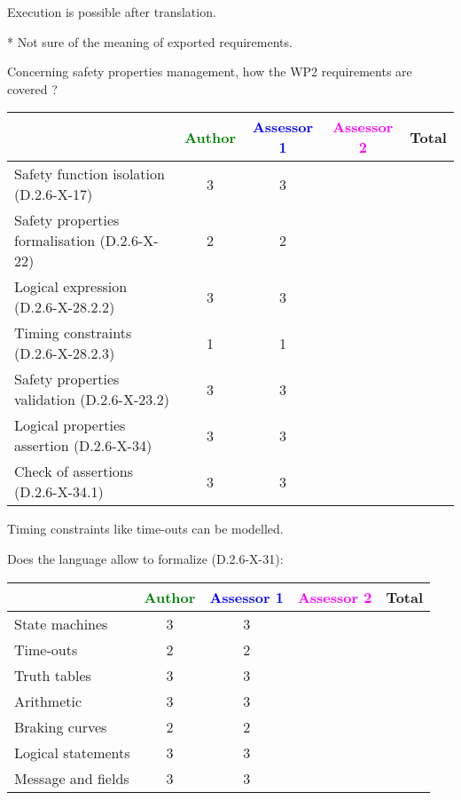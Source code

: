 \begin{author_comment}
Execution is possible after translation.
\end{author_comment}
\begin{assessor1}
* Not sure of the meaning of exported requirements.
\end{assessor1}

Concerning safety properties management, how the WP2 requirements are covered ?

\begin{tabular}{|l | c | c | c | c|}
\hline
& \textcolor{green}{Author} & \textcolor{blue}{Assessor 1} & \textcolor{magenta}{Assessor 2} & Total \\
\hline 
Safety function isolation (D.2.6-X-17)  & 3 & 3 & &  \\
\hline 
Safety properties formalisation (D.2.6-X-22)  & 2 & 2 & &  \\
\hline
Logical expression (D.2.6-X-28.2.2)  & 3 & 3 & &  \\
\hline
Timing constraints (D.2.6-X-28.2.3)  & 1 & 1 & &  \\
\hline
Safety properties validation (D.2.6-X-23.2)  & 3 & 3 & &  \\
\hline
Logical properties assertion (D.2.6-X-34)  &  3 & 3 & &  \\
\hline
Check  of assertions (D.2.6-X-34.1)  & 3 & 3 & &  \\
\hline
\end{tabular}


\begin{author_comment}
Timing constraints like time-outs can be modelled.
\end{author_comment}


Does the language allow to  formalize (D.2.6-X-31):

\begin{tabular}{|l | c | c | c | c|}
\hline
& \textcolor{green}{Author} & \textcolor{blue}{Assessor 1} & \textcolor{magenta}{Assessor 2} & Total \\
\hline 
State machines  & 3 & 3 & &  \\
\hline
Time-outs  & 2 & 2 & &  \\
\hline
Truth tables  & 3 & 3 & &  \\
\hline
Arithmetic  & 3 & 3 & &  \\
\hline
Braking curves  & 2 & 2 & &  \\
\hline
Logical statements & 3 & 3 & &  \\
\hline
Message and fields & 3 & 3 & &  \\
\hline
\end{tabular}


